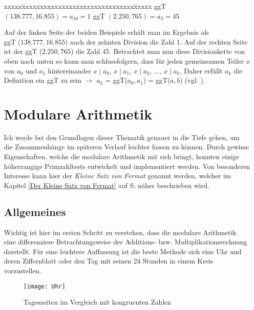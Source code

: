 \documentclass[german,12pt,a4paper]{article}
\begin{document}
\begin{tabbing}
xxxxx\=xxxxxxxxxxxxxxxxxxxxxxxxxxxxxxx\=xxxxx\kill
\> ggT $(138.777, 16.855) = a_{10} = 1$ \> ggT $(2.250, 765) = a_3 = 45$
\end{tabbing}

Auf der linken Seite der beiden Beispiele erhält man im Ergebnis als\\
ggT ($138.777, 16.855$) nach der zehnten Division die Zahl 1. Auf der rechten Seite ist der ggT ($2.250, 765$) die Zahl 45.
Betrachtet man nun diese Divisionkette von oben nach unten so kann man schlussfolgern, dass für jeden gemeinsamen Teiler $x$ von $a_0$ und $a_1$ hintereinander $x \mid a_0$, $x \mid a_1$, $x \mid a_2$, ..., $x \mid a_k$.\newline
Daher erfüllt $a_k$ die Definition ein ggT zu sein $\to$ $a_k$ = ggT($a_0,a_1$) = ggT($a, b$) (vgl. \cite[58--59]{Remmert1995}).

\section{Modulare Arithmetik}\label{Modulare Arithmetik}
Ich werde bei den Grundlagen dieser Thematik genauer in die Tiefe gehen, um die Zusammenhänge im späteren Verlauf leichter fassen zu können. Durch gewisse Eigenschaften, welche die modulare Arithmetik mit sich bringt, konnten einige höherrangige Primzahltests entwickelt und implementiert werden. Von besonderen Interesse kann hier der \textit{Kleine Satz von Fermat} genannt werden, welcher im Kapitel \ref{Der Kleine Satz von Fermat} auf S. \pageref{Der Kleine Satz von Fermat} näher beschrieben wird.

\subsection{Allgemeines}\label{Allgemeines}
Wichtig ist hier im ersten Schritt zu verstehen, dass die modulare Arithmetik eine differenziere Betrachtungsweise der Additions- bzw. Multiplikationsrechnung darstellt.
Für eine leichtere Auffassung ist die beste Methode sich eine Uhr und deren Ziffernblatt oder den Tag mit seinen 24 Stunden in einem Kreis vorzustellen.

\begin{figure}[h]
 \centering
 \texttt{[image: Uhr]}
 \caption{Tageszeiten im Vergleich mit kongruenten Zahlen}
 \label{fig:Tageszeiten im Vergleich mit kongruenten Zahlen}
 \cite[298]{Meinel2011}
\end{figure}
\end{document}
